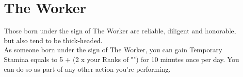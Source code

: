\section{The Worker}\label{zodiac:worker}

Those born under the sign of The Worker are reliable, diligent and honorable, but also tend to be thick-headed.\\
As someone born under the sign of The Worker, you can gain Temporary Stamina equals to 5 + (2 x your Ranks of "") for 10 minutes once per day.
You can do so as part of any other action you're performing.\\